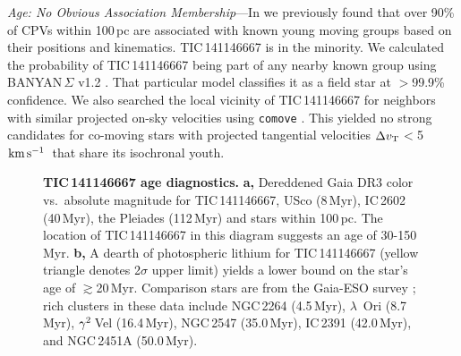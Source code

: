\documentclass[11pt,twocolumn,tighten,linenumbers]{aastex7}
\newcommand{\kms}{\ensuremath{\rm km\,s^{-1}}}
\begin{document}
{\it Age: No Obvious Association Membership}---In \citet{Bouma2024} we
previously found that over 90\% of CPVs within 100\,pc are associated
with known young moving groups based on their positions and
kinematics.  TIC\,141146667 is in the minority.  We calculated the
probability of TIC\,141146667 being part of any nearby known group
using BANYAN\,$\Sigma$ v1.2 \citep{Gagne2018}.  That particular model
classifies it as a field star at $>$99.9\% confidence.  We also
searched the local vicinity of TIC\,141146667 for neighbors with
similar projected on-sky velocities using \texttt{comove}
\citep{Tofflemire2021}.  This yielded no strong candidates for
co-moving stars with projected tangential velocities $\Delta v_{\rm
T}$$<$5\,\kms\ that share its isochronal youth.

\begin{figure}[!t]
	\begin{center}
	\end{center}
	\vspace{-0.3cm}
  \caption{{\bf TIC\,141146667 age diagnostics.}
  {\bf a,} Dereddened Gaia DR3 color vs.~absolute magnitude for
  TIC\,141146667, USco (8\,Myr), IC\,2602 (40\,Myr), the Pleiades
  (112\,Myr) and stars within 100\,pc. 
  The location of TIC\,141146667 in this diagram suggests an age of
  30-150\,Myr. 
  {\bf b,} A dearth of photospheric lithium for TIC\,141146667 (yellow
  triangle denotes 2$\sigma$ upper limit) yields a lower bound on the
  star's age of $\gtrsim$20\,Myr.  Comparison stars are from the
  Gaia-ESO survey \citep{Jeffries2023}; rich clusters in these data
  include NGC\,2264 (4.5\,Myr), $\lambda$~Ori (8.7\,Myr), ${\rm
  \gamma}^2$\,Vel (16.4\,Myr), NGC\,2547 (35.0\,Myr), IC\,2391
  (42.0\,Myr), and NGC\,2451A (50.0\,Myr).}
  \label{fig:age_diagnostics}
\end{figure}
\end{document}
